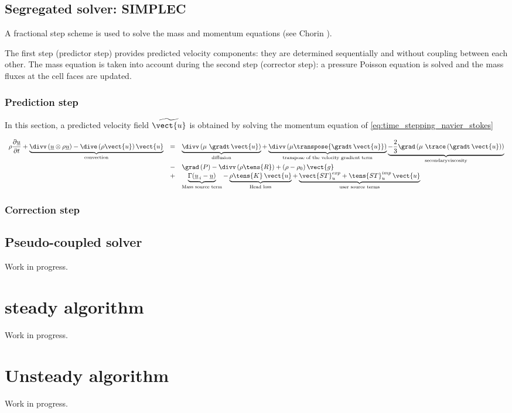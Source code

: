 \subsection{Segregated solver: SIMPLEC}
A fractional step scheme is used to solve the mass and momentum equations
(see Chorin \cite{Chorin:????}). 

The first step (predictor step) provides predicted velocity
components: they are determined sequentially and without coupling between
each other. The mass equation is taken into account during the second step
(corrector step): a pressure Poisson equation is solved and the mass fluxes
at the cell faces are updated.

\subsubsection{Prediction step}
In this section, a predicted velocity field $ \widetilde{\vect{u}} $ is obtained by solving 
the momentum equation of \eqref{eq:time_stepping_navier_stokes}

\begin{equation}
\begin{array}{rcl}
\displaystyle \rho \dfrac{\partial \underline {u} } {\partial t} 
+
\underbrace {
\divv \left( \underline{u} \otimes  \rho\underline{u} \right)
-
\dive \left( \rho \vect{u} \right) \vect{u}
}_{
\mathrm{convection}
}%
&= & \underbrace{
\divv \left(\mu\ \gradt \, \vect{u} \right)
}_{
\mathrm{diffusion}
}%
 + 
\underbrace{
\divv \left( \mu \transpose{\gradt \, \vect{u}} \right)
}_{
\text{transpose of the velocity gradient term}
}%
\underbrace{ 
-  \frac{2}{3} \grad \left( \mu\ \trace \left( \gradt \, \vect{u}  \right) \right)
}_{
\mathrm{secondary viscosity}
}%
\\
 &-& \grad \left( P \right)
 - \divv \left( \rho \tens{R} \right)
 + \left( \rho -\rho_0 \right) \vect{g} \\
&\displaystyle +&
\underbrace{
\Gamma(\underline{u}_{\,i}-\underline{u})
}_{
\text{Mass source term}
}%
- 
\underbrace{
\rho \tens{K} \, \vect{u}
}_{
\text{Head loss}
}%
 + 
\underbrace{ 
\vect{ST}_{u}^{exp}+ \tens{ST}_{u}^{imp}\, \vect{u}
}_{
\text{user source terms}
}%
\end{array}
\end{equation}

\subsubsection{Correction step}


\subsection{Pseudo-coupled solver}
Work in progress.
\section{steady algorithm}
Work in progress.
\section{Unsteady algorithm}
Work in progress.
